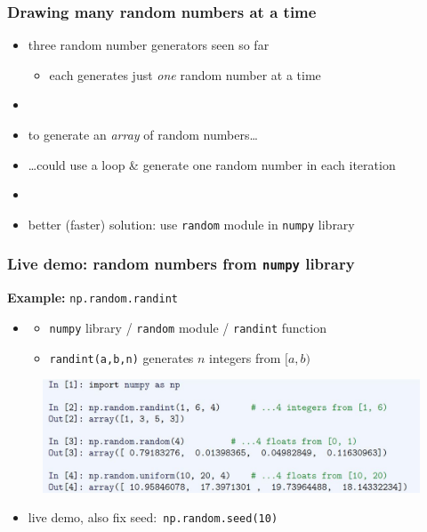 \documentclass[english,14pt]{beamer}
\begin{document}

\begin{frame}[fragile]

\frametitle{Drawing \textbf{many} random numbers at a time}

\begin{itemize}
	\item three random number generators seen so far
	\begin{itemize}
		\item each generates just \emph{one} random number at a time
	\end{itemize}
	\item[]
	\item to generate an \emph{array} of random numbers\ldots
	\item[] \ldots could use a loop \& generate one random number in each iteration
	\item[]
	\item better (faster) solution: use \texttt{random} module in \texttt{numpy} library

\end{itemize}

\end{frame}


\begin{frame}[fragile]

\frametitle{Live demo: random numbers from \texttt{numpy} library}

\textbf{Example:} \texttt{np.random.randint}

\begin{itemize}
	\item[]
	\begin{itemize}
		\item \texttt{numpy} library / \texttt{random} module / \texttt{randint} function
		\item \texttt{randint(a,b,n)} generates $n$ integers from $[a,b)$
	\end{itemize}
\end{itemize}

\begin{figure}[ht]
	\centering
	\includegraphics[width=\textwidth]{figures/LLp55b}
\end{figure}

\begin{itemize}
	\item live demo, also fix seed:~\texttt{np.random.seed(10)}
\end{itemize}

\end{frame}
\end{document}
